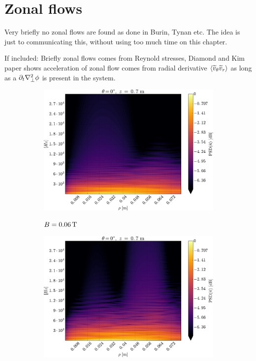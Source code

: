 \section{Zonal flows}
\label{chap:zonal}

Very briefly no zonal flows are found as done in Burin, Tynan etc.
The idea is just to communicating this, without using too much time on this chapter.

If included: Briefly zonal flows comes from Reynold stresses, Diamond and Kim paper shows acceleration of zonal flow comes from radial derivative $\langle{\widetilde{ v}_\theta\widetilde{ v}_r}\rangle$ as long as a $\partial_t \nabla_\perp^2 \phi$ is present in the system.
%
\begin{figure}[htbp]
    \centering
    \begin{subfigure}[h]{0.45\textwidth}
        \centering
        \includegraphics[width=1.0\textwidth]{fig/results/zonal/PSD2D006}
        \label{fig:PSD2D006}
        \caption{$B=0.06\, \text{T}$}
    \end{subfigure}%
    \hfill
    \begin{subfigure}[h]{0.45\textwidth}
        \centering
        \includegraphics[width=1.0\textwidth]{fig/results/zonal/PSD2D008}

\end{subfigure}
\end{figure}
